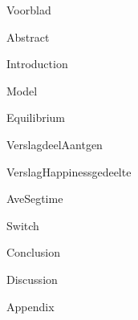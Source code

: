 \documentclass{article}
\begin{document}
{Voorblad}
\newpage


{Abstract}
\newpage

\tableofcontents
\newpage

{Introduction}
\newpage

{Model}
\newpage

{Equilibrium}
\newpage

{VerslagdeelAantgen}
\newpage

{VerslagHappinessgedeelte}
\newpage

{AveSegtime}
\newpage

{Switch}
\newpage

{Conclusion}
\newpage

{Discussion}
\newpage

{Appendix}
\end{document}
